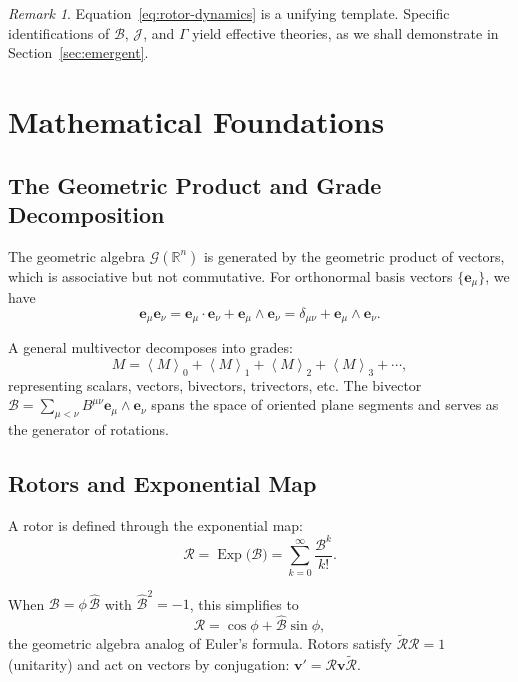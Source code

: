 \documentclass[11pt,a4paper]{article}
\newcommand{\e}{\mathbf{e}}
\newcommand{\R}{\mathbb{R}}
\newcommand{\grade}[2]{\left\langle #1 \right\rangle_{#2}}
\newcommand{\scal}[1]{\grade{#1}{0}}
\newcommand{\vecp}[1]{\grade{#1}{1}}
\newcommand{\biv}[1]{\grade{#1}{2}}
\newcommand{\triv}[1]{\grade{#1}{3}}
\newcommand{\rev}[1]{\widetilde{#1}}           %
\newcommand{\Exp}{\operatorname{Exp}}
\newcommand{\Rotor}{\mathcal{R}}
\newcommand{\Biv}{\mathcal{B}}
\theoremstyle{definition}
\theoremstyle{plain}
\theoremstyle{remark}
\newtheorem{remark}{Remark}
\begin{document}
\begin{remark}
Equation~\eqref{eq:rotor-dynamics} is a unifying template. Specific identifications of $\Biv$, $\mathcal{J}$, and $\Gamma$ yield effective theories, as we shall demonstrate in Section~\ref{sec:emergent}.
\end{remark}

\vspace{1em}

\section{Mathematical Foundations}\label{sec:math}

\subsection{The Geometric Product and Grade Decomposition}

The geometric algebra $\mathcal{G}(\R^n)$ is generated by the geometric product of vectors, which is associative but not commutative. For orthonormal basis vectors $\{\e_\mu\}$, we have
\begin{equation}
\e_\mu \e_\nu = \e_\mu \cdot \e_\nu + \e_\mu \wedge \e_\nu = \delta_{\mu\nu} + \e_\mu \wedge \e_\nu.
\end{equation}

A general multivector decomposes into grades:
\begin{equation}
M = \scal{M} + \vecp{M} + \biv{M} + \triv{M} + \cdots,
\end{equation}
representing scalars, vectors, bivectors, trivectors, etc. The bivector $\Biv = \sum_{\mu<\nu} B^{\mu\nu} \e_\mu \wedge \e_\nu$ spans the space of oriented plane segments and serves as the generator of rotations.

\subsection{Rotors and Exponential Map}

A rotor is defined through the exponential map:
\begin{equation}
\Rotor = \Exp\!\big(\Biv\big) = \sum_{k=0}^\infty \frac{\Biv^k}{k!}.
\end{equation}

When $\Biv = \phi\,\hat{\Biv}$ with $\hat{\Biv}^2 = -1$, this simplifies to
\begin{equation}
\Rotor = \cos\phi + \hat{\Biv}\sin\phi,
\end{equation}
the geometric algebra analog of Euler's formula. Rotors satisfy $\rev{\Rotor}\Rotor = 1$ (unitarity) and act on vectors by conjugation: $\mathbf{v}' = \Rotor \mathbf{v} \rev{\Rotor}$.
\end{document}
